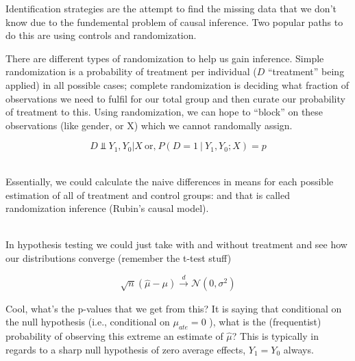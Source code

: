 \documentclass[12pt]{article}\usepackage[]{graphicx}\usepackage[]{color}
\begin{document}
\begin{flushleft}
Identification strategies are the attempt to find the missing data that we don't know due to the fundemental problem of causal inference. Two popular paths to do this are using controls and randomization.

There are different types of randomization to help us gain inference. Simple randomization is a probability of treatment per individual ($D$ ``treatment'' being applied) in all possible cases; complete randomization is deciding what fraction of observations we need to fulfil for our total group and then curate our probability of treatment to this. Using randomization, we can hope to ``block'' on these observations (like gender, or X) which we cannot randomally assign.

\begin{equation}
D \Vbar Y_1, Y_0 | X ~ \text{or,} ~ P(D=1 ~ | ~ Y_1, Y_0; X) = p
\end{equation}

\hfill \\

Essentially, we could calculate the naive differences in means for each possible estimation of all of treatment and control groups: and that is called randomization inference (Rubin's causal model).


\hfill \\

In hypothesis testing we could just take with and without treatment and see how our distributions converge (remember the t-test stuff)

\begin{equation}
\sqrt{n}(\hat{\mu} - \mu) \xrightarrow[]{d} \mathcal{N}(0, \sigma^2)
\end{equation}

Cool, what's the p-values that we get from this? It is saying that conditional on the null hypothesis (i.e., conditional on $\mu_{ate} = 0$ ), what is the (frequentist) probability of observing this extreme an estimate of $\hat{\mu}$? This is typically in regards to a sharp null hypothesis of zero average effects, $Y_1 = Y_0$ always. 




\hfill \\




\end{flushleft}
\end{document}
